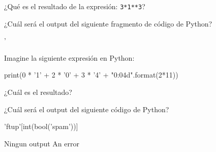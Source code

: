 \begin{ejercicio}¿Qué es el resultado de la expresión: \verb|3*1**3|?

\begin{choices}
\end{choices}
\end{ejercicio}

\begin{ejercicio}¿Cuál será el output del siguiente fragmento de código de Python?

\begin{python}
'%
\end{python}

\begin{choices}
    \choice {} %
    \choice {}
    \choice {}
    \choice {}
\end{choices}
\end{ejercicio}


\begin{ejercicio}
Imagine la siguiente expresión en Python:

\begin{python}
print(0 * '1' + 2 * '0' + 3 * '4' + "{0:04d}".format(2*11))
\end{python}

¿Cuál es el resultado?


\begin{choices}
    \choice {} %
    \choice {}
    \choice {}
    \choice {}
\end{choices}

\end{ejercicio}

\begin{ejercicio} ¿Cuál será el output del siguiente código de Python?

\begin{python}
'ftup'[int(bool('spam'))]
\end{python}

\begin{choices}
    \choice {}   %
    \choice  {}
    \choice  Ningun output
    \choice  An error
\end{choices}
\end{ejercicio}




